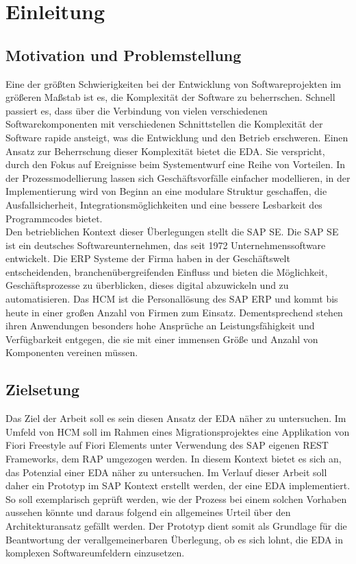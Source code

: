\section{Einleitung}
\subsection{Motivation und Problemstellung}
Eine der größten Schwierigkeiten bei der Entwicklung von Softwareprojekten im größeren Maßstab ist es, die Komplexität der Software zu beherrschen. Schnell passiert es, dass über die Verbindung von vielen verschiedenen Softwarekomponenten mit verschiedenen Schnittstellen die Komplexität der Software rapide ansteigt, was die Entwicklung und den Betrieb erschweren. \cite[Vgl.][S. 5]{pressman2005software} Einen Ansatz zur Beherrschung dieser Komplexität bietet die \ac{EDA}. Sie verspricht, durch den Fokus auf Ereignisse beim Systementwurf eine Reihe von Vorteilen. In der Prozessmodellierung lassen sich Geschäftsvorfälle einfacher modellieren, in der Implementierung wird von Beginn an eine modulare Struktur geschaffen, die Ausfallsicherheit, Integrationsmöglichkeiten und eine bessere Lesbarkeit des Programmcodes bietet. \cite[Vgl. ][S. 8f]{EDA2010} \\
Den betrieblichen Kontext dieser Überlegungen stellt die SAP SE. Die SAP SE ist ein deutsches Softwareunternehmen, das seit 1972 Unternehmenssoftware entwickelt. Die \ac{ERP} Systeme der Firma haben in der Geschäftswelt entscheidenden, branchenübergreifenden Einfluss und bieten die Möglichkeit, Geschäftsprozesse zu überblicken, dieses digital abzuwickeln und zu automatisieren. \cite[Vgl.][]{sapse_was} 
Das HCM ist die Personallösung des SAP ERP und kommt bis heute in einer großen Anzahl von Firmen zum Einsatz. Dementsprechend stehen ihren Anwendungen besonders hohe Ansprüche an Leistungsfähigkeit und Verfügbarkeit entgegen, die sie mit einer immensen Größe und Anzahl von Komponenten vereinen müssen.

\subsection{Zielsetung}
Das Ziel der Arbeit soll es sein diesen Ansatz der \acl{EDA} näher zu untersuchen. Im Umfeld von HCM soll im Rahmen eines Migrationsprojektes eine Applikation von Fiori Freestyle auf Fiori Elements unter Verwendung des SAP eigenen \ac{REST} Frameworks, dem \ac{RAP} umgezogen werden. In diesem Kontext bietet es sich an, das Potenzial einer \ac{EDA} näher zu untersuchen. Im Verlauf dieser Arbeit soll daher ein Prototyp im SAP Kontext erstellt werden, der eine \ac{EDA} implementiert. So soll exemplarisch geprüft werden, wie der Prozess bei einem solchen Vorhaben aussehen könnte und daraus folgend ein allgemeines Urteil über den Architekturansatz gefällt werden. Der Prototyp dient somit als Grundlage für die Beantwortung der verallgemeinerbaren Überlegung, ob es sich lohnt, die \ac{EDA} in komplexen Softwareumfeldern einzusetzen.

